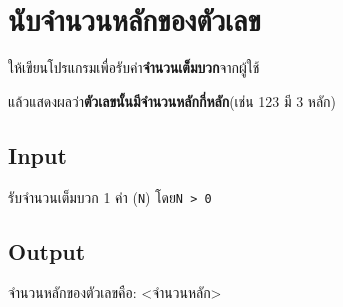 \documentclass{article}
\begin{document}
\section*{นับจำนวนหลักของตัวเลข}

ให้เขียนโปรแกรมเพื่อรับค่า\textbf{จำนวนเต็มบวก}จากผู้ใช้

แล้วแสดงผลว่า\textbf{ตัวเลขนั้นมีจำนวนหลักกี่หลัก}(เช่น 123 มี 3 หลัก)\\



\subsection*{Input}
รับจำนวนเต็มบวก 1 ค่า (\texttt{N}) โดย\texttt{N\ \textgreater{}\ 0}\\



\subsection*{Output}
จำนวนหลักของตัวเลขคือ: \textless จำนวนหลัก\textgreater{}\\
\end{document}

